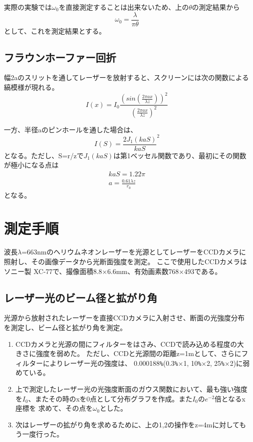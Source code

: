 \documentclass[11pt,a4j]{jsarticle}
\begin{document}
  実際の実験では$\omega_0$を直接測定することは出来ないため、上の$\theta$の測定結果から
  \begin{equation}
   \omega_0 = \frac{\lambda}{\pi \theta}
  \end{equation}
  として、これを測定結果とする。


  
  \subsection{フラウンホーファー回折}
  幅2aのスリットを通してレーザーを放射すると、スクリーンには次の関数による縞模様が現れる。
  \begin{equation}
   I(x) = I_0 \frac{(sin(\frac{2\pi ax}{\lambda z}))^2}{(\frac{2\pi ax}{\lambda z})^2}
  \end{equation}
  
  一方、半径aのピンホールを通した場合は、
  \begin{equation}
   I(S) = {\frac{2J_1 (kaS)}{kaS}}^2
  \end{equation}
  となる。ただし、S=r/zで$J_1 (kaS)$は第1ベッセル関数であり、最初にその関数が極小になる点は
  \begin{eqnarray}
   kaS = 1.22 \pi \\
   a = \frac{0.61 \lambda z}{r_0}
  \end{eqnarray}
  となる。



  
  
  
  
 \section{測定手順}
 波長$\lambda$=663nmのヘリウムネオンレーザーを光源としてレーザーをCCDカメラに照射し、その画像データから光断面強度を測定。
 ここで使用したCCDカメラはソニー製 XC-77で、撮像面積8.8×6.6mm、有効画素数768×493である。
  \subsection{レーザー光のビーム径と拡がり角}
  光源から放射されたレーザーを直接CCDカメラに入射させ、断面の光強度分布を測定し、ビーム径と拡がり角を測定。
  \begin{enumerate}
   \item CCDカメラと光源の間にフィルターをはさみ、CCDで読み込める程度の大きさに強度を弱めた。
         ただし、CCDと光源間の距離z=1mとして、さらにフィルターによりレーザー光の強度は、
         0.000188\verb|%|(0.3\verb|%|×1, 10\verb|%|×2, 25\verb|%|×2)に弱めている。
   \item 上で測定したレーザー光の光強度断面のガウス関数において、最も強い強度を$I_0$、またその時のxを0点として分布グラフを作成。また$I_0$の$e^{-2}$倍となるx座標を
         求めて、その点を$\omega_0$とした。
   \item 次はレーザーの拡がり角を求めるために、上の1,2の操作をz=4mに対してもう一度行った。
  \end{enumerate}
\end{document}
